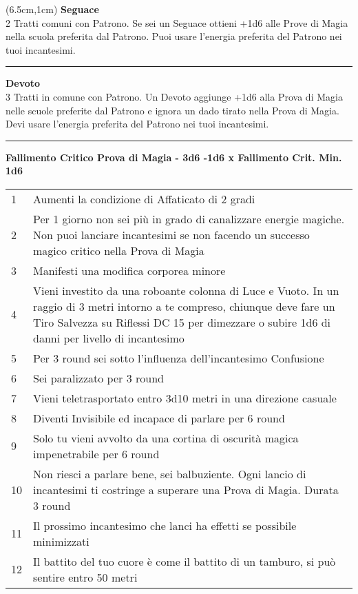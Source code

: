 \documentclass[a4paper,12 pt,openany]{book}
\newcommand{\riga}{\rule{\textwidth}{0.4pt}}
\begin{document}
\begin{textblock*}{13.5cm}(6.5cm,1cm) %
\textbf{Seguace}\\
2 Tratti comuni con Patrono. Se sei un Seguace ottieni +1d6 alle Prove di Magia nella scuola preferita dal Patrono. Puoi usare l'energia preferita del Patrono nei tuoi incantesimi.\\

\riga

\textbf{Devoto}\\
3 Tratti in comune con Patrono. Un Devoto aggiunge +1d6 alla Prova di Magia nelle scuole preferite dal Patrono e ignora un dado tirato nella Prova di Magia. Devi usare l'energia preferita del Patrono nei tuoi incantesimi.

\riga

\textbf{Fallimento Critico Prova di Magia - 3d6 -1d6 x Fallimento Crit. Min. 1d6}
\begin{tabularx}{0.95\textwidth}{lX}
1 & Aumenti la condizione di Affaticato di 2 gradi\\
2 & Per 1 giorno non sei più in grado di canalizzare energie magiche. Non puoi lanciare incantesimi se non facendo un successo magico critico nella Prova di Magia\\
3 & Manifesti una modifica corporea minore\\
4 & Vieni investito da una roboante colonna di Luce e Vuoto. In un raggio di 3 metri intorno a te compreso, chiunque deve fare un Tiro Salvezza su Riflessi DC 15 per dimezzare o subire 1d6 di danni per livello di incantesimo\\
5 & Per 3 round sei sotto l'influenza dell'incantesimo Confusione\\
6 & Sei paralizzato per 3 round\\
7 & Vieni teletrasportato entro 3d10 metri in una direzione casuale\\
8 & Diventi Invisibile ed incapace di parlare per 6 round\\
9 &  Solo tu vieni avvolto da una cortina di oscurità magica impenetrabile per 6 round\\
10 & Non riesci a parlare bene, sei balbuziente. Ogni lancio di incantesimi ti costringe a superare una Prova di Magia. Durata 3 round\\
11 & Il prossimo incantesimo che lanci ha effetti se possibile minimizzati\\
12 & Il battito del tuo cuore è come il battito di un tamburo, si può sentire entro 50 metri\\

\end{tabularx}
\end{textblock*}
\end{document}
